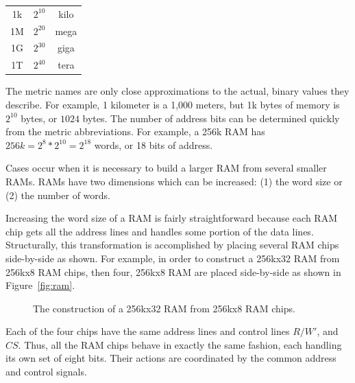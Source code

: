 \begin{tabular}{ccc}

1k & $2^{10}$ & kilo \\ 
1M & $2^{20}$ & mega \\ 
1G & $2^{30}$ & giga \\ 
1T & $2^{40}$ & tera \\ 

\end{tabular}

The metric names are only close approximations to the actual, binary values
they describe.  For example, 1 kilometer is a 1,000 meters, but 
1k bytes of memory is $2^{10}$ bytes, or $1024$ bytes.  The number of 
address bits can be determined quickly from the metric abbreviations.
For example, a 256k RAM has $256k=2^8*2^{10}=2^{18}$ words, or 18 bits 
of address.

Cases occur when it is necessary to build a larger RAM from several
smaller RAMs.  RAMs have two dimensions which can be increased: (1) the word size or 
(2) the number of words.  

Increasing the word size of a RAM is fairly straightforward because 
each RAM chip gets all the address lines and handles some portion of 
the data lines.  Structurally, this transformation is accomplished by
placing several RAM chips side-by-side as shown. For example, in order 
to construct a 256kx32 RAM from 256kx8 RAM chips, then four, 256kx8 RAM are 
placed side-by-side as shown in Figure~\ref{fig:ram}.

\begin{figure}[ht]
\caption{The construction of a 256kx32 RAM from 256kx8 RAM chips.}
\label{fig:wide}
\end{figure}

Each of the four chips have the same address lines and control
lines $R/W'$, and $CS$.  Thus, all the RAM chips behave in exactly the same 
fashion, each handling its own set of eight bits.  Their actions are coordinated
by the common address and control signals.

